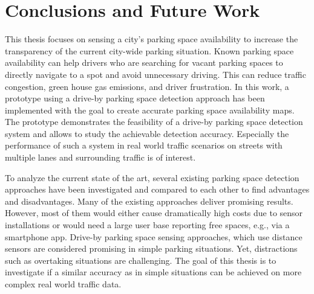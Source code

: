 \chapter{Conclusions and Future Work}
\label{chap:conclusion}



This thesis focuses on sensing a city's parking space availability to increase the transparency of the current city-wide parking situation. 
Known parking space availability can help drivers who are searching for vacant parking spaces to directly navigate to a spot and avoid unnecessary driving. This can reduce traffic congestion, green house gas emissions, and driver frustration. 
In this work, a prototype using a drive-by parking space detection approach has been implemented with the goal to create accurate parking space availability maps. The prototype demonstrates the feasibility of a drive-by parking space detection system and allows to study the achievable detection accuracy. Especially the performance of such a system in real world traffic scenarios on streets with multiple lanes and surrounding traffic is of interest.

To analyze the current state of the art, several existing parking space detection approaches have been investigated and compared to each other to find advantages and disadvantages.
Many of the existing approaches deliver promising results. However, most of them would either cause dramatically high costs due to sensor installations or would need a large user base reporting free spaces, e.g., via a smartphone app.
Drive-by parking space sensing approaches, which use distance sensors are considered promising in simple parking situations. Yet, distractions such as overtaking situations are challenging. 
The goal of this thesis is to investigate if a similar accuracy as in simple situations can be achieved on more complex real world traffic data.

